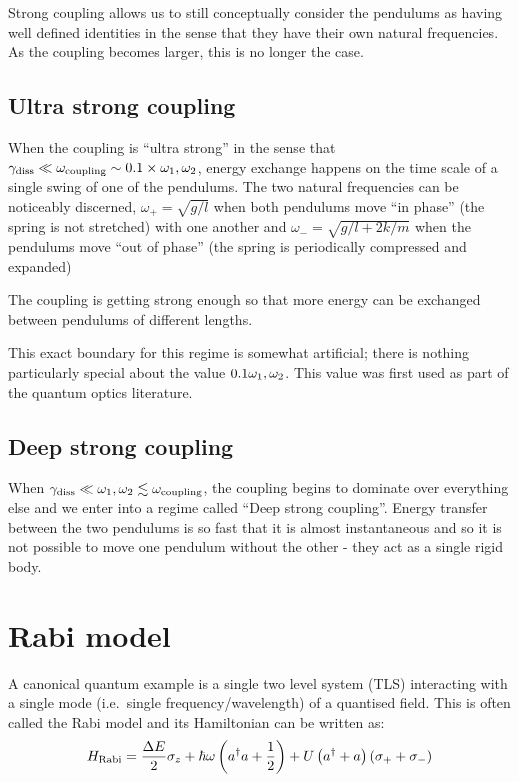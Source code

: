\documentclass[
]{article}
\renewcommand{\[}{\begin{equation}}
\renewcommand{\]}{\end{equation}}
\begin{document}
Strong coupling allows us to still conceptually consider the pendulums
as having well defined identities in the sense that they have their own
natural frequencies. As the coupling becomes larger, this is no longer
the case.

\subsection{Ultra strong coupling}\label{ultra-strong-coupling}

When the coupling is ``ultra strong'' in the sense that
\(\gamma_{\rm diss} \ll \omega_{\rm coupling} \sim 0.1\times  \omega_1,\omega_2\),
energy exchange happens on the time scale of a single swing of one of
the pendulums. The two natural frequencies can be noticeably discerned,
\(\omega_+ = \sqrt{g/l}\) when both pendulums move ``in phase'' (the
spring is not stretched) with one another and
\(\omega_- = \sqrt{g/l + 2k/m}\) when the pendulums move ``out of
phase'' (the spring is periodically compressed and expanded)

The coupling is getting strong enough so that more energy can be
exchanged between pendulums of different lengths.

This exact boundary for this regime is somewhat artificial; there is
nothing particularly special about the value
\(0.1 \omega_{\rm 1}, \omega_2\). This value was first used as part of
the quantum optics literature.

\subsection{Deep strong coupling}\label{deep-strong-coupling}

When
\(\gamma_{\rm diss} \ll \omega_1,\omega_2 \lesssim \omega_{\rm coupling}\),
the coupling begins to dominate over everything else and we enter into a
regime called ``Deep strong coupling''. Energy transfer between the two
pendulums is so fast that it is almost instantaneous and so it is not
possible to move one pendulum without the other - they act as a single
rigid body.

\section{Rabi model}\label{rabi-model}

A canonical quantum example is a single two level system (TLS)
interacting with a single mode (i.e.~single frequency/wavelength) of a
quantised field. This is often called the Rabi model and its Hamiltonian
can be written as: \[
H_{\rm Rabi} = \frac{\Delta E}{2} \sigma_z + \hbar\omega\left(a^{\dagger}a +\frac{1}{2}\right) + U\left( a^{\dagger} + a \right)(\sigma_+ + \sigma_-)
\label{eq:rabiH}
\]
\end{document}

